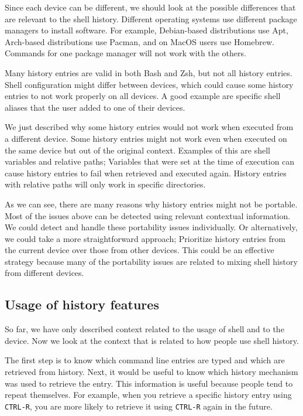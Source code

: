 Since each device can be different, we should look at the possible differences that are relevant to the shell history. Different operating systems use different package managers to install software. For example, Debian-based distributions use Apt, Arch-based distributions use Pacman, and on MacOS users use Homebrew. Commands for one package manager will not work with the others.

Many history entries are valid in both Bash and Zsh, but not all history entries. Shell configuration might differ between devices, which could cause some history entries to not work properly on all devices. A good example are specific shell aliases that the user added to one of their devices.

We just described why some history entries would not work when executed from a different device. Some history entries might not work even when executed on the same device but out of the original context. Examples of this are shell variables and relative paths; Variables that were set at the time of execution can cause history entries to fail when retrieved and executed again. History entries with relative paths will only work in specific directories.

As we can see, there are many reasons why history entries might not be portable. Most of the issues above can be detected using relevant contextual information. 
We could detect and handle these portability issues individually. Or alternatively, we could take a more straightforward approach; Prioritize history entries from the current device over those from other devices. This could be an effective strategy because many of the portability issues are related to mixing shell history from different devices. 

\subsection{Usage of history features}

So far, we have only described context related to the usage of shell and to the device. Now we look at the context that is related to how people use shell history. 

The first step is to know which command line entries are typed and which are retrieved from history. Next, it would be useful to know which history mechanism was used to retrieve the entry. This information is useful because people tend to repeat themselves. 
For example, when you retrieve a specific history entry using \verb|CTRL-R|, you are more likely to retrieve it using \verb|CTRL-R| again in the future. %

